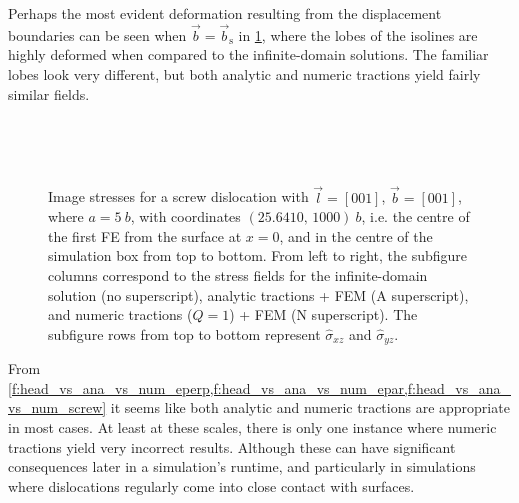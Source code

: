 \documentclass[11pt]{iopart}
\begin{document}
Perhaps the most evident deformation resulting from the displacement boundaries can be seen when $\vec{b} = \vec{b}_{\textrm{s}}$ in \cref{f:head_vs_ana_vs_num_screw}, where the lobes of the isolines are highly deformed when compared to the infinite-domain solutions. The familiar lobes look very different, but both analytic and numeric tractions yield fairly similar fields.
\begin{figure}
    \centering
    ~
    ~

    ~
    ~
    \caption{Image stresses for a screw dislocation with $\vec{l} = [0 0 1]$, $\vec{b} = [0 0 1]$, where $a = 5~b$, with coordinates $(25.6410,\, 1000)~b$, i.e. the centre of the first FE from the surface at $x=0$, and in the centre of the simulation box from top to bottom. From left to right, the subfigure columns correspond to the stress fields for the infinite-domain solution (no superscript), analytic tractions + FEM (A superscript), and numeric tractions ($Q = 1$) + FEM (N superscript). The subfigure rows from top to bottom represent $\hat{\sigma}_{xz}$ and $\hat{\sigma}_{yz}$.}
    \label{f:head_vs_ana_vs_num_screw}
\end{figure}

From \cref{f:head_vs_ana_vs_num_eperp,f:head_vs_ana_vs_num_epar,f:head_vs_ana_vs_num_screw} it seems
like both analytic and numeric tractions are appropriate in most cases. At least at these scales, there is only one instance where numeric tractions yield very incorrect results. Although these can have significant consequences later in a simulation's runtime, and particularly in simulations where dislocations regularly come into close contact with surfaces.
\end{document}
